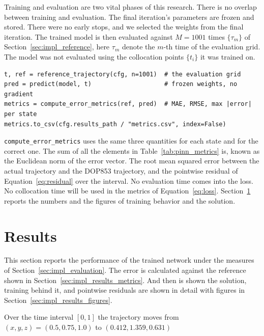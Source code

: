 Training and evaluation are two vital phases of this research. There is no overlap between training and evaluation. The final iteration's parameters are frozen and stored. There were no early stops, and we selected the weights from the final iteration. The trained model is then evaluated against $M = 1001$ times $\{\tau_m\}$ of Section~\ref{sec:impl_reference}, here $\tau_m$ denote the $m$-th time of the evaluation grid. The model was not evaluated using the collocation points $\{t_i\}$ it was trained on.

\begin{lstlisting}[caption={The evaluation pass, abridged from \texttt{train.py}. The metrics of Table~\ref{tab:pinn_metrics} come from line 3.}, label={lst:evaluate}]
t, ref = reference_trajectory(cfg, n=1001)  # the evaluation grid
pred = predict(model, t)                    # frozen weights, no gradient
metrics = compute_error_metrics(ref, pred)  # MAE, RMSE, max |error| per state
metrics.to_csv(cfg.results_path / "metrics.csv", index=False)
\end{lstlisting}

\texttt{compute\_error\_metrics} uses the same three quantities for each state and for the correct one.
The sum of all the elements in Table~\ref{tab:pinn_metrics} is, known as the Euclidean norm of the error vector. The root mean squared error between the actual trajectory and the DOP853 trajectory, and the pointwise residual of Equation~\ref{eq:residual} over the interval. No evaluation time comes into the loss. No collocation time will be used in the metrics of Equation~\ref{eq:loss}. Section~\ref{sec:impl_results} reports the
numbers and the figures of training behavior and the solution.



\section{Results}
\label{sec:impl_results}

This section reports the performance of the trained network under the measures of Section~\ref{sec:impl_evaluation}. The error is calculated against the reference shown in Section~\ref{sec:impl_results_metrics}. And then is shown the solution, training behind it, and pointwise residuals are shown in detail with figures in Section~\ref{sec:impl_results_figures}. 

Over the time interval  $[0, 1]$ the trajectory moves from $(x, y, z) = (0.5, 0.75, 1.0)$ to $(0.412, 1.359, 0.631)$

